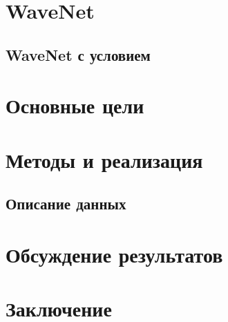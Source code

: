 \documentclass{spbau-diploma}
\begin{document}
\section{WaveNet}
\label{sec:wavenet}


\subsection{WaveNet с условием}
\label{sec:conditional_wavenet}


\section{Основные цели}
\label{sec:goals}



\section{Методы и реализация}

\subsection{Описание данных}
\label{sec:data}


\label{sec:implementation}


\newpage
\section{Обсуждение результатов}
\label{sec:experiments}



\section{Заключение}
\label{sec:results}




\end{document}
